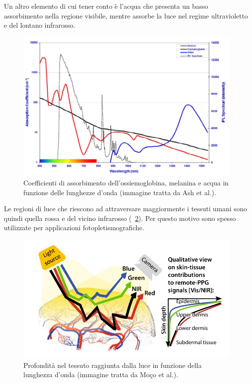 Un altro elemento di cui tener conto è l'acqua che presenta un basso assorbimento nella regione visibile, mentre assorbe la luce nel regime ultravioletto e del lontano infrarosso. 
\begin{figure}[tb]
	\centering
	\includegraphics[width=1\linewidth]{ImageFiles/Fotopletismografia/PicchiAssorbimento}
	\caption{Coefficienti di assorbimento dell'ossiemoglobina, melanina e acqua in funzione delle lunghezze d'onda (immagine tratta da Ash et al.\cite{Ash2017}).}
	\label{fig:PicchiAssorbimento}
\end{figure}
Le regioni di luce che riescono ad attraversare maggiormente i tessuti umani sono quindi quella rossa e del vicino infrarosso (\Fig~\ref{fig:PenetrazioneLuce}). Per questo motivo sono spesso utilizzate per applicazioni fotopletismografiche.
\begin{figure}[tb]
	\centering
	\includegraphics[width=0.8\linewidth]{ImageFiles/Fotopletismografia/PenetrazioneLuce}
	\caption{Profondità nel tessuto raggiunta dalla luce in funzione della lunghezza d'onda (immagine tratta da Moço et al.\cite{Moco2021}).}
	\label{fig:PenetrazioneLuce}
\end{figure}
